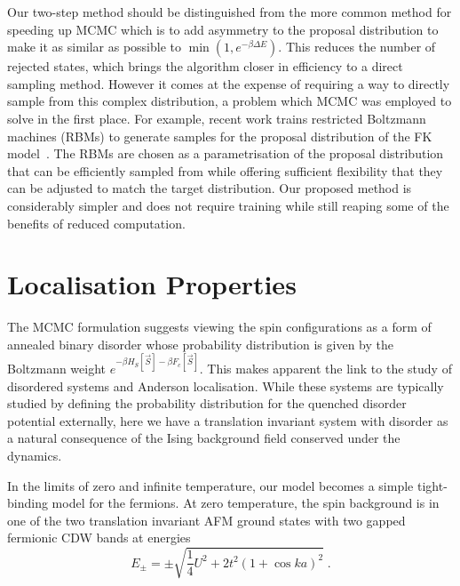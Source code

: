 Our two-step method should be distinguished from the more common method for speeding up \ac{MCMC} which is to add asymmetry to the proposal distribution to make it as similar as possible to \(\min\left(1, e^{-\beta \Delta E}\right)\). This reduces the number of rejected states, which brings the algorithm closer in efficiency to a direct sampling method. However it comes at the expense of requiring a way to directly sample from this complex distribution, a problem which \ac{MCMC} was employed to solve in the first place. For example, recent work trains restricted Boltzmann machines (RBMs) to generate samples for the proposal distribution of the \ac{FK} model~\cite{huangAcceleratedMonteCarlo2017}. The RBMs are chosen as a parametrisation of the proposal distribution that can be efficiently sampled from while offering sufficient flexibility that they can be adjusted to match the target distribution. Our proposed method is considerably simpler and does not require training while still reaping some of the benefits of reduced computation.

\section{Localisation Properties}

The \ac{MCMC} formulation suggests viewing the spin configurations as a form of annealed binary disorder whose probability distribution is given by the Boltzmann weight \(e^{-\beta H_S[\vec{S}] - \beta F_c[\vec{S}]}\). This makes apparent the link to the study of disordered systems and Anderson localisation. While these systems are typically studied by defining the probability distribution for the quenched disorder potential externally, here we have a translation invariant system with disorder as a natural consequence of the Ising background field conserved under the dynamics.  
%

In the limits of zero and infinite temperature, our model becomes a simple tight-binding model for the fermions. At zero temperature, the spin background is in one of the two translation invariant AFM ground states with two gapped fermionic CDW bands at energies
\[E_{\pm} = \pm\sqrt{\frac{1}{4}U^2 + 2t^2(1 + \cos ka)^2}\;.\]

